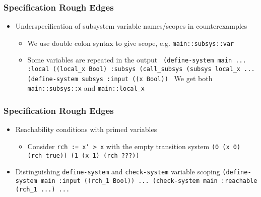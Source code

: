 \documentclass[11pt,xcolor={dvipsnames},hyperref={pdftex,pdfpagemode=UseNone,hidelinks,pdfdisplaydoctitle=true},usepdftitle=false]{beamer}
\newcommand{\code}[1]{{\footnotesize\texttt{#1}}}
\begin{document}
\begin{frame}
    \frametitle{Specification Rough Edges}
    \begin{itemize}
        \item Underspecification of subsystem variable names/scopes in counterexamples \pause
        \begin{itemize}
            \item We use double colon syntax to give scope, e.g. \code{main::subsys::var} \pause
            \item Some variables are repeated in the output \pause \newline 
            \code {
                (define-system main ... \newline 
                    \hspace{1cm} :local ((local\_x Bool)  \newline 
                    :subsys (call\_subsys (subsys local\_x ... \newline 
                (define-system subsys \newline
                    :input ((x Bool)) \newline
            } 
            We get both \code{main::subsys::x} and \code{main::local\_x}
        \end{itemize}
    \end{itemize}
\end{frame}

\begin{frame}
    \frametitle{Specification Rough Edges}
    \begin{itemize}
        \item Reachability conditions with primed variables \pause
        \begin{itemize}
            \item Consider \code{rch := x' > x} with the empty transition system \newline 
            \code{(0 (x 0) (rch true)) \newline
            (1 (x 1) (rch ???))}
        \end{itemize} \pause
            \item Distinguishing \code{define-system} and \code{check-system} variable scoping \pause \newline 
            \code{(define-system main :input ((rch\_1 Bool)) ...  \newline
         (check-system main :reachable (rch\_1 ...) ...}
    \end{itemize}
\end{frame}
\end{document}
